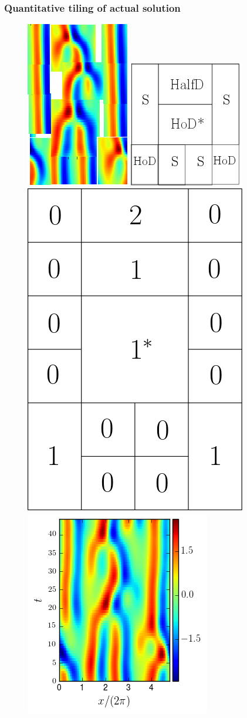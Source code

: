 \documentclass[mathserif, handout]{beamer}
\begin{document}
\begin{frame}%
  \frametitle{Quantitative tiling of actual solution}
  \begin{figure}
  \includegraphics[width=.25\textwidth,height=.3\textheight]{MNG_ppo_frankenstein}
  \includegraphics[width=.25\textwidth,height=.3\textheight]{MNG_approxsymbdyn}
  \includegraphics[width=.25\textwidth,height=.3\textheight]{MNG_approxsymbdyntrinary}
  \includegraphics[width=.3\textwidth,height=.3\textheight]{MNG_ppo_L30_T44}
  \end{figure}
\end{frame}
\end{document}
